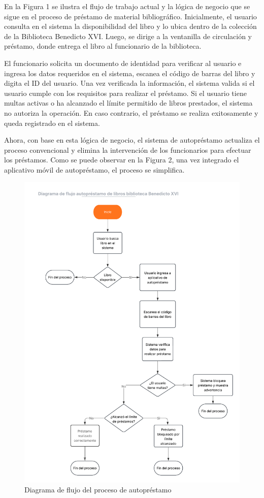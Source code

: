 \documentclass[spanish]{ieee_upb}
\begin{document}
En la Figura 1 se ilustra el flujo de trabajo actual y la lógica de negocio que se sigue en el proceso de préstamo de material bibliográfico. Inicialmente, el usuario consulta en el sistema la disponibilidad del libro y lo ubica dentro de la colección de la Biblioteca Benedicto XVI. Luego, se dirige a la ventanilla de circulación y préstamo, donde entrega el libro al funcionario de la biblioteca.\vspace{0.3 cm}

El funcionario solicita un documento de identidad para verificar al usuario e ingresa los datos requeridos en el sistema, escanea el código de barras del libro y digita el ID del usuario. Una vez verificada la información, el sistema valida si el usuario cumple con los requisitos para realizar el préstamo. Si el usuario tiene multas activas o ha alcanzado el límite permitido de libros prestados, el sistema no autoriza la operación. En caso contrario, el préstamo se realiza exitosamente y queda registrado en el sistema.\vspace{0.3 cm}

Ahora, con base en esta lógica de negocio, el sistema de autopréstamo actualiza el proceso convencional y elimina la intervención de los funcionarios para efectuar los préstamos. Como se puede observar en la Figura 2, una vez integrado el aplicativo móvil de autopréstamo, el proceso se simplifica.\vspace{0.3 cm}

\begin{figure}[H]
    \centering
    \includegraphics[width=0.7\linewidth]{img/DFpasosAutoPrestamo.png}
    \caption[Préstamo de libros biblioteca Benedicto XVI]{Diagrama de flujo del proceso de autopréstamo}
    \label{fig:FlujoAutoprestamo}
\end{figure}
\end{document}
